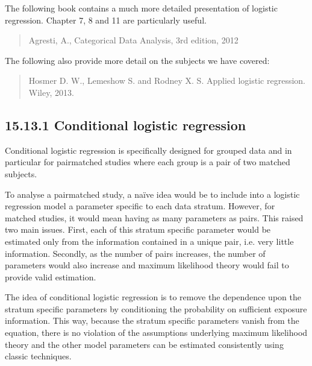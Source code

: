 \documentclass[letterpaper,10pt,english]{jupyterBook}
\begin{document}
\sphinxAtStartPar
The following book contains a much more detailed presentation of logistic regression. Chapter 7, 8 and 11 are particularly useful.
\begin{quote}

\sphinxAtStartPar
Agresti, A., Categorical Data Analysis, 3rd edition, 2012
\end{quote}

\sphinxAtStartPar
The following also provide more detail on the subjects we have covered:
\begin{quote}

\sphinxAtStartPar
Hosmer D. W., Lemeshow S. and Rodney X. S. Applied logistic regression. Wiley, 2013.
\end{quote}
\begin{quote}

\sphinxAtStartPar
{}
\end{quote}


\subsection{15.13.1  Conditional logistic regression}
\label{\detokenize{15.l. Logistic Regression:conditional-logistic-regression}}
\sphinxAtStartPar
Conditional logistic regression is specifically designed for grouped data and in particular for pair\sphinxhyphen{}matched studies where each group is a pair of two matched subjects.

\sphinxAtStartPar
To analyse a pair\sphinxhyphen{}matched study, a naïve idea would be to include into a logistic regression model a parameter specific to each data stratum. However, for matched studies, it would mean having as many parameters as pairs. This raised two main issues. First, each of this stratum specific parameter would be estimated only from the information contained in a unique pair, i.e. very little information. Secondly, as the number of pairs increases, the number of parameters would also increase and maximum likelihood theory would fail to provide valid estimation.

\sphinxAtStartPar
The idea of conditional logistic regression is to remove the dependence upon the stratum specific parameters by conditioning the probability on sufficient exposure information. This way, because the stratum specific parameters vanish from the equation, there is no violation of the assumptions underlying maximum likelihood theory  and the other model parameters can be estimated consistently using classic techniques.
\end{document}
